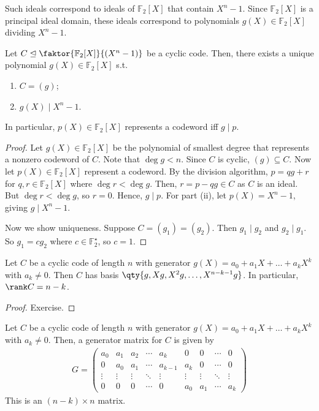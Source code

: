 Such ideals correspond to ideals of $\mathbb F_2[X]$ that contain $X^n - 1$.
Since $\mathbb F_2[X]$ is a principal ideal domain, these ideals correspond to polynomials $g(X) \in \mathbb F_2[X]$ dividing $X^n - 1$.
\begin{theorem}
    Let $C \trianglelefteq \faktor{\mathbb F_2[X]}{(X^n - 1)}$ be a cyclic code.
    Then, there exists a unique  polynomial $g(X) \in \mathbb F_2[X]$ s.t.
    \begin{enumerate}
        \item $C = (g)$;
        \item $g(X) \mid X^n - 1$.
    \end{enumerate}
    In particular, $p(X) \in \mathbb F_2[X]$ represents a codeword iff $g \mid p$.
\end{theorem}
\begin{proof}
    Let $g(X) \in \mathbb F_2[X]$ be the polynomial of smallest degree that represents a nonzero codeword of $C$.
    Note that $\deg g < n$.
    Since $C$ is cyclic, $(g) \subseteq C$.
    Now let $p(X) \in \mathbb F_2[X]$ represent a codeword.
    By the division algorithm, $p = qg + r$ for $q, r \in \mathbb F_2[X]$ where $\deg r < \deg g$.
    Then, $r = p - qg \in C$ as $C$ is an ideal.
    But $\deg r < \deg g$, so $r = 0$.
    Hence, $g \mid p$.
    For part (ii), let $p(X) = X^n - 1$, giving $g \mid X^n - 1$.

    Now we show uniqueness.
    Suppose $C = (g_1) = (g_2)$.
    Then $g_1 \mid g_2$ and $g_2 \mid g_1$.
    So $g_1 = cg_2$ where $c \in \mathbb F_2^\star$, so $c = 1$.
\end{proof}
\begin{lemma}
    Let $C$ be a cyclic code of length $n$ with generator $g(X) = a_0 + a_1 X + \dots + a_k X^k$ with $a_k \neq 0$.
    Then $C$ has basis $\qty{g, Xg, X^2g, \dots, X^{n-k-1}g}$.
    In particular, $\rank C = n - k$.
\end{lemma}
\begin{proof}
    Exercise.
\end{proof}
\begin{corollary}
    Let $C$ be a cyclic code of length $n$ with generator $g(X) = a_0 + a_1 X + \dots + a_k X^k$ with $a_k \neq 0$.
    Then, a generator matrix for $C$ is given by
    \begin{align*}
        G = \begin{pmatrix}
            a_0 & a_1 & a_2 & \cdots & a_k & 0 & 0 & \cdots & 0 \\
            0 & a_0 & a_1 & \cdots & a_{k-1} & a_k & 0 & \cdots & 0 \\
            \vdots & \vdots & \vdots & \ddots & \vdots & \vdots & \vdots & \ddots & \vdots \\
            0 & 0 & 0 & \cdots & 0 & a_0 & a_1 & \cdots & a_k
        \end{pmatrix}
    \end{align*}
    This is an $(n - k) \times n$ matrix.
\end{corollary}
